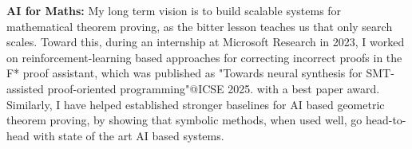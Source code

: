 \documentclass[11pt,a4paper,sans,colorlinks]{moderncv}        %
\begin{document}
\textbf{AI for Maths:} My long term vision is to build scalable systems for mathematical theorem proving, as the bitter lesson teaches us that only search scales. Toward this, during an internship at Microsoft Research in 2023, I worked on reinforcement-learning based approaches for correcting incorrect proofs in the F* proof assistant, which was published as "Towards neural synthesis for SMT-assisted proof-oriented programming"@ICSE 2025. with a best paper award. Similarly, I have helped established stronger baselines for AI based geometric theorem proving, by showing that symbolic methods, when used well, go head-to-head with state of the art AI based systems.


% 
% 
% 
% 
% 
% 
% 
% 
% 
% 
\end{document}
